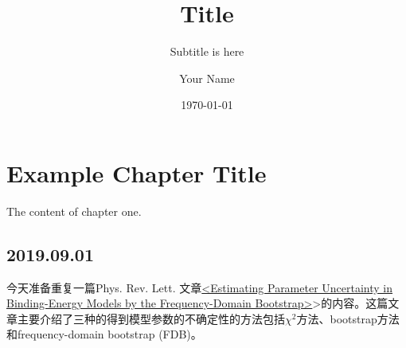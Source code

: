 \documentclass[lang=cn,11pt]{elegantbook}
\title{Title}
\subtitle{Subtitle is here}
\author{Your Name}
\institute{XXX University}
\date{\today}
\begin{document}
\maketitle
\tableofcontents
\mainmatter
\hypersetup{pageanchor=true}
\chapter{Example Chapter Title}
The content of chapter one.
\section{2019.09.01}
今天准备重复一篇Phys. Rev. Lett. 文章\cite{RN569,RN549}\href{https://journals.aps.org/prl/abstract/10.1103/PhysRevLett.119.252501}{<Estimating Parameter Uncertainty in Binding-Energy Models by the Frequency-Domain Bootstrap>}>的内容。这篇文章主要介绍了三种的得到模型参数的不确定性的方法包括$\chi^2$方法\cite{PhysRevLett.119.251301,RN553,RN550}、bootstrap方法和frequency-domain bootstrap (FDB)。


\end{document}
